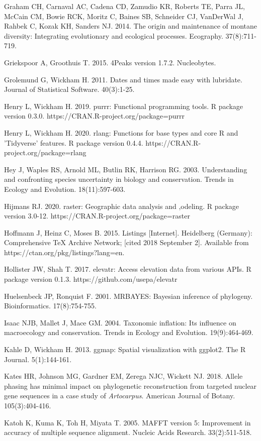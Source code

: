 Graham CH, Carnaval AC, Cadena CD, Zamudio KR, Roberts TE, Parra JL, McCain CM, Bowie RCK, Moritz C, Baines SB, Schneider CJ, VanDerWal J, Rahbek C, Kozak KH, Sanders NJ. 2014. The origin and maintenance of montane diversity: Integrating evolutionary and ecological processes. Ecography. 37(8):711-719.

Griekspoor A, Groothuis T. 2015. 4Peaks version 1.7.2. Nucleobytes.

Grolemund G, Wickham H. 2011. Dates and times made easy with lubridate. Journal of Statistical Software. 40(3):1-25.

Henry L, Wickham H. 2019. purrr: Functional programming tools. R package version 0.3.0. https://CRAN.R-project.org/package=purrr

Henry L, Wickham H. 2020. rlang: Functions for base types and core R and 'Tidyverse' features. R package version 0.4.4. https://CRAN.R-project.org/package=rlang

Hey J, Waples RS, Arnold ML, Butlin RK, Harrison RG. 2003. Understanding and confronting species uncertainty in biology and conservation. Trends in Ecology and Evolution. 18(11):597-603.

Hijmans RJ. 2020. raster: Geographic data analysis and ,odeling. R package version 3.0-12. https://CRAN.R-project.org/package=raster


Hoffmann J, Heinz C, Moses B. 2015. Listings [Internet]. Heidelberg (Germany): Comprehensive TeX Archive Network; [cited 2018 September 2]. Available from https://ctan.org/pkg/listings?lang=en.

Hollister JW, Shah T. 2017. elevatr: Access elevation data from various APIs. R package version 0.1.3. https://github.com/usepa/elevatr

Huelsenbeck JP, Ronquist F. 2001. MRBAYES: Bayesian inference of phylogeny. Bioinformatics. 17(8):754-755.

Isaac NJB, Mallet J, Mace GM. 2004. Taxonomic inflation: Its influence on macroecology and conservation. Trends in Ecology and Evolution. 19(9):464-469.

Kahle D, Wickham H. 2013. ggmap: Spatial visualization with ggplot2. The R Journal. 5(1):144-161.

Kates HR, Johnson MG, Gardner EM, Zerega NJC, Wickett NJ. 2018. Allele phasing has minimal impact on phylogenetic reconstruction from targeted nuclear gene sequences in a case study of \textit{Artocarpus}. American Journal of Botany. 105(3):404-416.

Katoh K, Kuma K, Toh H, Miyata T. 2005. MAFFT version 5: Improvement in accuracy of multiple sequence alignment. Nucleic Acids Research. 33(2):511-518.

